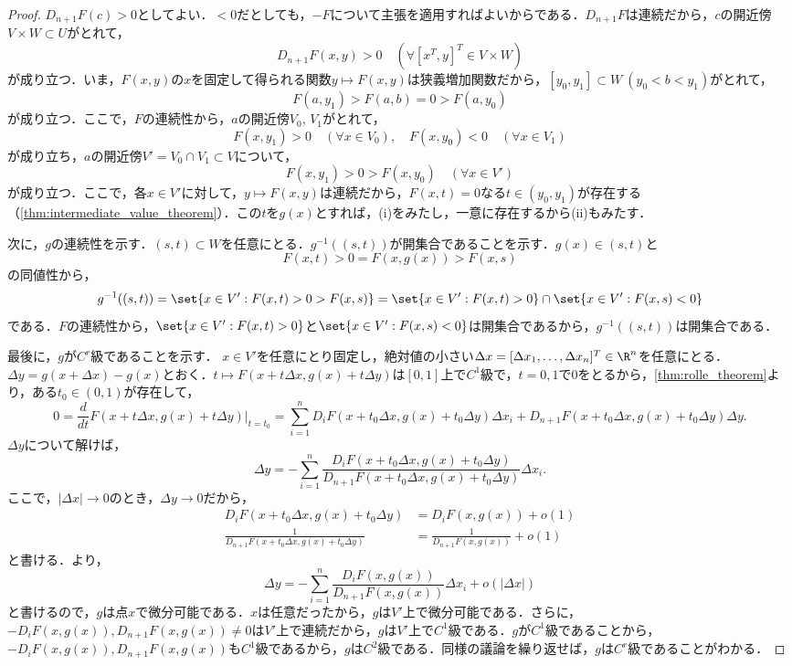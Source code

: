\documentclass[a4paper,10pt]{ltjsarticle}
\begin{document}
\begin{proof}
  \(D_{n+1}F(c) > 0\)としてよい．\(<0\)だとしても，\(-F\)について主張を適用すればよいからである．\(D_{n+1}F\)は連続だから，\(c\)の開近傍\(V \times W \subset U\)がとれて，
  \[ D_{n+1}F(x, y) > 0 \quad (\forall [x^T, y]^T \in V \times W) \]
  が成り立つ．いま，\(F(x, y)\)の\(x\)を固定して得られる関数\(y \mapsto F(x, y)\)は狭義増加関数だから，\([y_0, y_1] \subset W \ (y_0 < b < y_1)\)がとれて，
  \[ F(a, y_1) > F(a, b) = 0 > F(a, y_0) \]
  が成り立つ．ここで，\(F\)の連続性から，\(a\)の開近傍\(V_0\), \(V_1\)がとれて，
  \[ F(x, y_1) > 0 \quad (\forall x \in V_0), \quad F(x, y_0) < 0 \quad (\forall x \in V_1) \]
  が成り立ち，\(a\)の開近傍\(V' = V_0 \cap V_1 \subset V\)について，
  \[ F(x, y_1) > 0 > F(x, y_0) \quad (\forall x \in V') \]
  が成り立つ．ここで，各\(x \in V'\)に対して，\(y \mapsto F(x, y)\)は連続だから，\(F(x, t) = 0\)なる\(t\in(y_0, y_1)\)が存在する（\cref{thm:intermediate_value_theorem}）．この\(t\)を\(g(x)\)とすれば，(i)をみたし，一意に存在するから(ii)もみたす．

  次に，\(g\)の連続性を示す．\((s, t) \subset W\)を任意にとる．\(g^{-1}((s, t))\)が開集合であることを示す．\(g(x) \in (s, t)\)と
  \[ F(x, t) > 0 = F(x, g(x)) > F(x, s) \]
  の同値性から，
  \[ g^{-1}((s, t)) = \set{x \in V' : F(x, t) > 0 > F(x, s)} = \set{x \in V' : F(x, t) > 0} \cap \set{x \in V' : F(x, s) < 0} \]
  である．\(F\)の連続性から，\(\set{x \in V' : F(x, t) > 0}\)と\(\set{x \in V' : F(x, s) < 0}\)は開集合であるから，\(g^{-1}((s, t))\)は開集合である．

  最後に，\(g\)が\(C^r\)級であることを示す．
  \(x \in V'\)を任意にとり固定し，絶対値の小さい\(\Delta x = [\Delta x_1, \dots, \Delta x_n]^T \in \R^n\)を任意にとる．\(\Delta y = g(x + \Delta x) - g(x)\)とおく．\(t \mapsto F(x + t\Delta x, g(x) + t\Delta y)\)は\([0, 1]\)上で\(C^1\)級で，\(t = 0, 1\)で\(0\)をとるから，\cref{thm:rolle_theorem}より，ある\(t_0 \in (0, 1)\)が存在して，
  \[ 0 = \frac{d}{dt}F(x + t\Delta x, g(x) + t\Delta y)\Big|_{t=t_0} = \sum_{i=1}^n D_iF(x + t_0\Delta x, g(x) + t_0\Delta y)\Delta x_i + D_{n+1}F(x + t_0\Delta x, g(x) + t_0\Delta y)\Delta y. \]
  \(\Delta y\)について解けば，
  \[ \Delta y = -\sum_{i=1}^n \frac{D_iF(x + t_0\Delta x, g(x) + t_0\Delta y)}{D_{n+1}F(x + t_0\Delta x, g(x) + t_0\Delta y)}\Delta x_i. \]
  ここで，\(|\Delta x| \to 0\)のとき，\(\Delta y \to 0\)だから，
  \begin{align*}
    D_iF(x + t_0\Delta x, g(x) + t_0\Delta y) & = D_iF(x, g(x)) + o(1) \\
    \frac{1}{D_{n+1}F(x + t_0\Delta x, g(x) + t_0\Delta y)} & = \frac{1}{D_{n+1}F(x, g(x))} + o(1)
  \end{align*}
  と書ける．より，
  \[ \Delta y = -\sum_{i=1}^n \frac{D_iF(x, g(x))}{D_{n+1}F(x, g(x))}\Delta x_i + o(|\Delta x|) \]
  と書けるので，\(g\)は点\(x\)で微分可能である．\(x\)は任意だったから，\(g\)は\(V'\)上で微分可能である．さらに，\(-D_iF(x, g(x)), D_{n+1}F(x, g(x))\ne0\)は\(V'\)上で連続だから，\(g\)は\(V'\)上で\(C^1\)級である．$g$が\(C^1\)級であることから，\(-D_iF(x, g(x)), D_{n+1}F(x, g(x))\)も\(C^1\)級であるから，\(g\)は\(C^2\)級である．同様の議論を繰り返せば，\(g\)は\(C^r\)級であることがわかる．
\end{proof}
\end{document}
